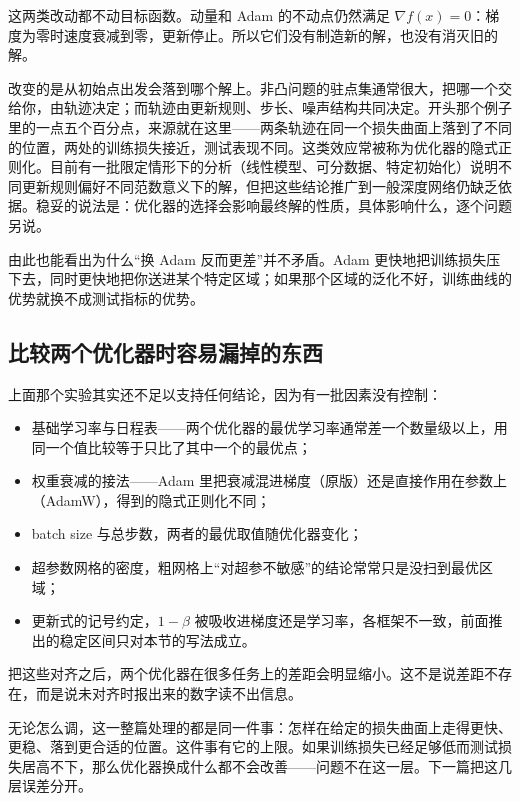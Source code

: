这两类改动都不动目标函数。动量和 Adam 的不动点仍然满足 \(\nabla f(x)=0\)：梯度为零时速度衰减到零，更新停止。所以它们没有制造新的解，也没有消灭旧的解。

改变的是从初始点出发会落到哪个解上。非凸问题的驻点集通常很大，把哪一个交给你，由轨迹决定；而轨迹由更新规则、步长、噪声结构共同决定。开头那个例子里的一点五个百分点，来源就在这里——两条轨迹在同一个损失曲面上落到了不同的位置，两处的训练损失接近，测试表现不同。这类效应常被称为优化器的隐式正则化。目前有一批限定情形下的分析（线性模型、可分数据、特定初始化）说明不同更新规则偏好不同范数意义下的解，但把这些结论推广到一般深度网络仍缺乏依据。稳妥的说法是：优化器的选择会影响最终解的性质，具体影响什么，逐个问题另说。

由此也能看出为什么``换 Adam 反而更差''并不矛盾。Adam 更快地把训练损失压下去，同时更快地把你送进某个特定区域；如果那个区域的泛化不好，训练曲线的优势就换不成测试指标的优势。

\subsection{比较两个优化器时容易漏掉的东西}

上面那个实验其实还不足以支持任何结论，因为有一批因素没有控制：

\begin{itemize}
\tightlist
\item
  基础学习率与日程表——两个优化器的最优学习率通常差一个数量级以上，用同一个值比较等于只比了其中一个的最优点；
\item
  权重衰减的接法——Adam 里把衰减混进梯度（原版）还是直接作用在参数上（AdamW），得到的隐式正则化不同；
\item
  batch size 与总步数，两者的最优取值随优化器变化；
\item
  超参数网格的密度，粗网格上``对超参不敏感''的结论常常只是没扫到最优区域；
\item
  更新式的记号约定，\(1-\beta\) 被吸收进梯度还是学习率，各框架不一致，前面推出的稳定区间只对本节的写法成立。
\end{itemize}

把这些对齐之后，两个优化器在很多任务上的差距会明显缩小。这不是说差距不存在，而是说未对齐时报出来的数字读不出信息。

无论怎么调，这一整篇处理的都是同一件事：怎样在给定的损失曲面上走得更快、更稳、落到更合适的位置。这件事有它的上限。如果训练损失已经足够低而测试损失居高不下，那么优化器换成什么都不会改善——问题不在这一层。下一篇把这几层误差分开。
